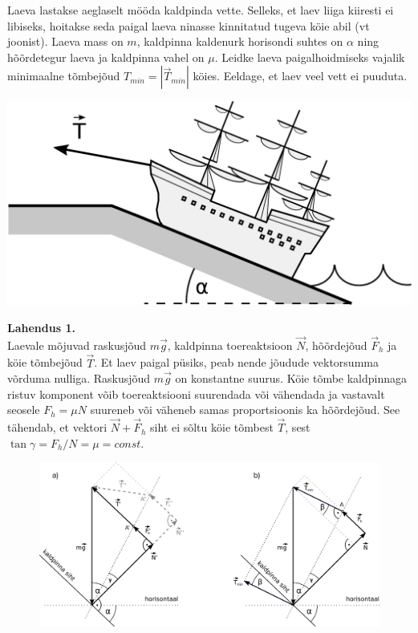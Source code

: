 
Laeva lastakse aeglaselt mööda kaldpinda vette. Selleks, et laev liiga kiiresti ei libiseks, hoitakse seda paigal laeva ninasse kinnitatud tugeva köie abil (vt joonist). Laeva mass on $m$,  kaldpinna kaldenurk horisondi suhtes on $\alpha$ ning hõõrdetegur laeva ja kaldpinna vahel on $\mu$. Leidke laeva paigalhoidmiseks vajalik minimaalne tõmbejõud $T_{min}=|\overrightarrow{T}_{min}|$ köies. Eeldage, et laev veel vett ei puuduta.
\begin{center}
	\includegraphics[width=0.4\linewidth]{2021-v2g-10-yl.pdf}
\end{center}


\hint

\solu
\textbf{Lahendus 1.} \\
Laevale mõjuvad raskusjõud $m\overrightarrow{g}$, kaldpinna toereaktsioon $\overrightarrow{N}$, hõõrdejõud $\overrightarrow{F}_h$ ja köie tõmbejõud $\overrightarrow{T}$. Et laev paigal püsiks, peab nende jõudude vektorsumma võrduma nulliga. Raskusjõud $m\overrightarrow{g}$ on konstantne suurus. Köie tõmbe kaldpinnaga ristuv komponent võib toereaktsiooni suurendada või vähendada ja vastavalt seosele $F_h=\mu N$ suureneb või väheneb samas proportsioonis ka hõõrdejõud. See tähendab, et vektori $\overrightarrow{N}+\overrightarrow{F}_h$ siht ei sõltu köie tõmbest $\overrightarrow{T}$, sest $\tan\gamma=F_h/N=\mu=\textit{const}$.

\begin{figure}[h]
\vspace{-0.0cm}
  \begin{center}
    \includegraphics[width=0.9\linewidth]{2021-v2g-10-yl1.pdf}
  \end{center}
  \vspace{-0.5cm}
\end{figure}

